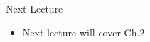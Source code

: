 \documentclass[aspectratio=1610]{beamer}
\begin{document}


\begin{frame}[wide]{Next Lecture}
	\begin{itemize}
		\item Next lecture will cover Ch.2
	\end{itemize}
\end{frame}
\end{document}
